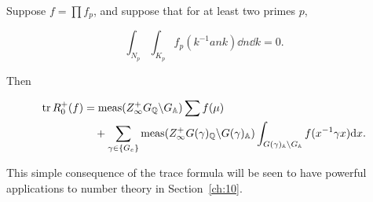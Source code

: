 \begin{corollary}\label{cor:9.24}

Suppose $f = \prod f_p$, and suppose that for at least two primes $p$,

\[
\int_{N_p}\int_{K_p} f_p(k^{-1}ank)\dd n\dd k = 0.
\]

Then

\[
\begin{aligned}
\operatorname{tr} R_0^{+}(f) &= \operatorname{meas}(Z_\infty^{+}G_{\mathbb{Q}} \backslash G_{\mathbb{A}})\sum f(\mu)\\
&\quad + \sum_{\gamma \in \{G_e\}}\operatorname{meas}(Z_\infty^{+}G(\gamma)_{\mathbb{Q}} \backslash G(\gamma)_{\mathbb{A}})\int_{G(\gamma)_{\mathbb{A}} \backslash G_{\mathbb{A}}} f(x^{-1}\gamma x)\mathrm{d} x.
\end{aligned}
\]

\end{corollary}

This simple consequence of the trace formula will be seen to have powerful applications to number theory in Section~\ref{ch:10}.

